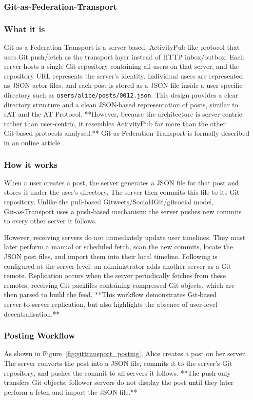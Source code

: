\subsubsection{Git-as-Federation-Transport}

\subsubsection*{What it is}
Git‑as‑a‑Federation‑Transport is a server‑based, ActivityPub‑like protocol that uses Git push/fetch as
the transport layer instead of HTTP inbox/outbox. Each server hosts a single Git repository
containing all users on that server, and the repository URL represents the server’s identity.
Individual users are represented as JSON actor files, and each post is stored as a JSON file inside a
user‑specific directory such as \texttt{users/alice/posts/0012.json}. This design provides a clear
directory structure and a clean JSON‑based representation of posts, similar to sAT and the AT
Protocol. **However, because the architecture is server‑centric rather than user‑centric, it resembles
ActivityPub far more than the other Git‑based protocols analysed.** Git-as-Federation-Transport is formally described in an online article \cite{gittransport2026}.

\subsubsection*{How it works}
When a user creates a post, the server generates a JSON file for that post and stores it under the
user’s directory. The server then commits this file to its Git repository. Unlike the pull‑based
Gitweets/Social4Git/gitsocial model, Git‑as‑Transport uses a push‑based mechanism: the server
pushes new commits to every other server it follows.

However, receiving servers do not immediately update user timelines. They must later perform a
manual or scheduled fetch, scan the new commits, locate the JSON post files, and import them into
their local timeline. Following is configured at the server level: an administrator adds another server
as a Git remote. Replication occurs when the server periodically fetches from these remotes,
receiving Git packfiles containing compressed Git objects, which are then parsed to build the feed.
**This workflow demonstrates Git‑based server‑to‑server replication, but also highlights the absence
of user‑level decentralisation.**

\subsubsection*{Posting Workflow}
As shown in Figure~\ref{fig:gittransport_posting}, Alice creates a post on her server. The server
converts the post into a JSON file, commits it to the server’s Git repository, and pushes the commit
to all servers it follows. **The push only transfers Git objects; follower servers do not display the post
until they later perform a fetch and import the JSON file.**

